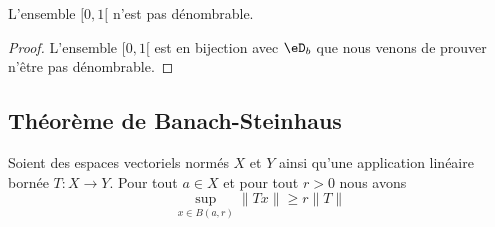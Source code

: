\begin{corollary}
    L'ensemble \( \mathopen[ 0 , 1 [\) n'est pas dénombrable.
\end{corollary}

\begin{proof}
    L'ensemble \( \mathopen[ 0 , 1 [\) est en bijection avec \( \eD_b\) que nous venons de prouver n'être pas dénombrable.
\end{proof}

\subsection{Théorème de Banach-Steinhaus}

\begin{lemma}     \label{LEMooPIPLooMppGSO}
    Soient des espaces vectoriels normés \( X\) et \( Y\) ainsi qu'une application linéaire bornée \( T\colon X\to Y\). Pour tout \( a\in X\) et pour tout \( r>0\) nous avons
    \begin{equation}
        \sup_{x\in B(a,r)}\| Tx \|\geq r\| T \|
    \end{equation}
\end{lemma}

